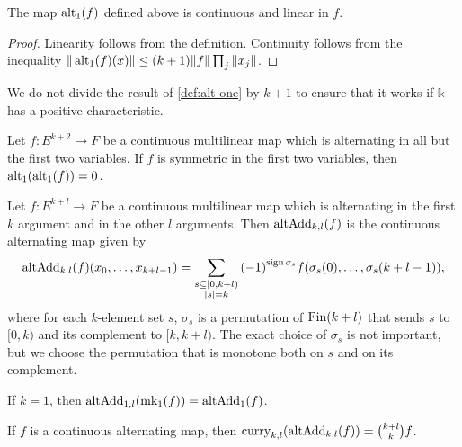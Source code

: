 \begin{lemma}%
  \label{lem:alt-one-linear}
  The map \(\operatorname{alt_1}(f)\) defined above is continuous and linear in \(f\).
\end{lemma}
\begin{proof}
  Linearity follows from the definition.
  Continuity follows from the inequality \(\|\operatorname{alt_1}(f)(x)\|\le (k + 1)\|f\|\prod_{j}\|x_{j}\|\).
\end{proof}

\begin{remark}
  We do not divide the result of \autoref{def:alt-one} by \(k + 1\)
  to ensure that it works if \(\mathbb k\) has a positive characteristic.
\end{remark}

\begin{theorem}%
  \label{thm:uncurry2-eq-zero}
  Let \(f\colon E^{k + 2}\to F\) be a continuous multilinear map which is alternating in all but the first two variables.
  If \(f\) is symmetric in the first two variables, then \(\operatorname{alt_1}(\operatorname{alt_1}(f)) = 0\).
\end{theorem}

\begin{definition}%
  \label{def:uncurry-fin-add}
  Let \(f\colon E^{k + l}\to F\) be a continuous multilinear map
  which is alternating in the first \(k\) argument and in the other \(l\) arguments.
  Then \(\operatorname{altAdd}_{k,l}(f)\) is the continuous alternating map given by
  \[
    \operatorname{altAdd}_{k,l}(f)(x_{0}, \dots, x_{k + l - 1})=\sum_{\substack{s\subseteq [0, k + l)\\|s|=k}}{(-1)}^{\operatorname{sign} \sigma_{s}}f(\sigma_{s}(0), \dots, \sigma_{s}(k + l - 1)),
  \]
  where for each \(k\)-element set \(s\),
  \(\sigma_{s}\) is a permutation of \(\operatorname{Fin} (k + l)\) that sends \(s\) to \([0, k)\) and its complement to \([k, k + l)\).
  The exact choice of \(\sigma_{s}\) is not important, but we choose the permutation that is monotone both on \(s\) and on its complement.
\end{definition}

\begin{theorem}%
  \label{thm:uncurry-fin-add-one}
  If \(k = 1\), then \(\operatorname{altAdd}_{1, l}(\operatorname{mk_1}(f)) = \operatorname{altAdd}_{1}(f)\).
\end{theorem}

\begin{theorem}%
  \label{thm:curry-uncurry-fin-add}
  If \(f\) is a continuous alternating map, then \(\operatorname{curry}_{k, l}(\operatorname{altAdd}_{k, l}(f)) = \binom{k + l}{k}f\).
\end{theorem}

